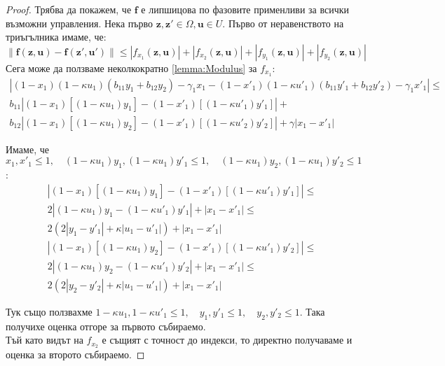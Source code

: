 \begin{proof}
  Трябва да покажем, че $\mathbf{f}$ е липшицова по фазовите применливи за всички възможни управления. Нека първо $\mathbf{z}, \mathbf{z}' \in \Omega, \mathbf{u} \in U$.
  Първо от неравенството на триъгълника имаме, че:
  \begin{equation}
    \|\mathbf{f}(\mathbf{z}, \mathbf{u}) - \mathbf{f}(\mathbf{z}', \mathbf{u}')\| \leq
    |f_{x_1}(\mathbf{z}, \mathbf{u})| + |f_{x_2}(\mathbf{z}, \mathbf{u})| + |f_{y_1}(\mathbf{z}, \mathbf{u})| + |f_{y_2}(\mathbf{z}, \mathbf{u})|
  \end{equation}
  Сега може да ползваме неколкократно \ref{lemma:Modulus} за $f_{x_1}$:
  \begin{multline}
    |(1-x_1) (1-\kappa u_1) \left(b_{11} y_1 + b_{12} y_2\right) - \gamma_1 x_1 - (1-x'_1) (1-\kappa u'_1) \left(b_{11} y'_1 + b_{12} y'_2\right) - \gamma_1 x'_1| \leq \\
    b_{11} \left|(1-x_1)[(1 - \kappa u_1) y_1] -  (1-x'_1)[(1 - \kappa u'_1) y'_1]\right| + \\
    b_{12} \left|(1-x_1)[(1 - \kappa u_1) y_2] -  (1-x'_1)[(1 - \kappa u'_2) y'_2]\right| + \gamma |x_1 - x'_1|
  \end{multline}

  Имаме, че $x_1, x'_1 \leq 1, \quad (1-\kappa u_1)y_1, (1-\kappa u_1) y'_1 \leq 1, \quad (1-\kappa u_1)y_2, (1-\kappa u_1) y'_2 \leq 1$:
  \begin{multline}
    \left|(1-x_1) [(1-\kappa u_1) y_1] - (1-x'_1) [(1-\kappa u'_1) y'_1]\right| \leq \\
    2 |(1-\kappa u_1) y_1 - (1-\kappa u'_1) y'_1| + |x_1 - x'_1| \leq \\
    2 (2|y_1 - y'_1| + \kappa |u_1 - u'_1|) + |x_1 - x'_1|
  \end{multline}
  \begin{multline}
    \left|(1-x_1) [(1-\kappa u_1) y_2] - (1-x'_1) [(1-\kappa u'_1) y'_2]\right| \leq \\
    2 |(1-\kappa u_1) y_2 - (1-\kappa u'_1) y'_2| + |x_1 - x'_1| \leq \\
    2 (2|y_2 - y'_2| + \kappa |u_1 - u'_1|) + |x_1 - x'_1|
  \end{multline}

  Тук също ползвахме $1-\kappa u_1, 1-\kappa u'_1 \leq 1, \quad y_1, y'_1 \leq 1, \quad y_2, y'_2 \leq 1$. Така получихе оценка отгоре за първото събираемо. \\
  Тъй като видът на $f_{x_2}$ е същият с точност до индекси, то директно получаваме и оценка за второто събираемо.


\end{proof}
